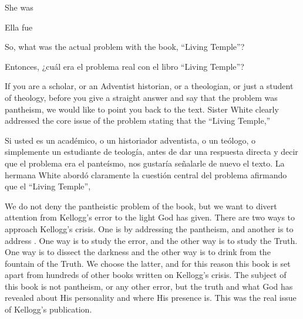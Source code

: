 She was 


Ella fue 


So, what was the actual problem with the book, “Living Temple”?


Entonces, ¿cuál era el problema real con el libro “Living Temple”?


If you are a scholar, or an Adventist historian, or a theologian, or just a student of theology, before you give a straight answer and say that the problem was pantheism, we would like to point you back to the text. Sister White clearly addressed the core issue of the problem stating that the “Living Temple,” 


Si usted es un académico, o un historiador adventista, o un teólogo, o simplemente un estudiante de teología, antes de dar una respuesta directa y decir que el problema era el panteísmo, nos gustaría señalarle de nuevo el texto. La hermana White abordó claramente la cuestión central del problema afirmando que el “Living Temple”, 


We do not deny the pantheistic problem of the book, but we want to divert attention from Kellogg’s error to the light God has given. There are two ways to approach Kellogg’s crisis. One is by addressing the pantheism, and another is to address . One way is to study the error, and the other way is to study the Truth. One way is to dissect the darkness and the other way is to drink from the fountain of the Truth. We choose the latter, and for this reason this book is set apart from hundreds of other books written on Kellogg’s crisis. The subject of this book is not pantheism, or any other error, but the truth and what God has revealed about His personality and where His presence is. This was the real issue of Kellogg’s publication.


